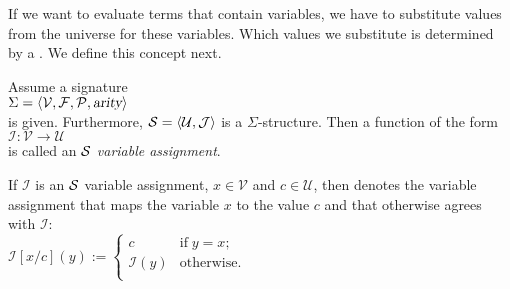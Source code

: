 If we want to evaluate terms that contain variables, we have to substitute values from the universe 
for these variables. Which values we substitute is determined by a .  We define this concept next. 

\begin{Definition}
    Assume a signature \\[0.2cm]
    \hspace*{1.3cm} $\Sigma = \langle \mathcal{V}, \mathcal{F}, \mathcal{P}, \textsl{arity} \rangle$ \\[0.2cm]
    is given.  Furthermore,  $\mathcal{S} = \langle \mathcal{U}, \mathcal{J} \rangle$ is a  $\Sigma$-structure.
    Then a function of the form \\[0.2cm]
    \hspace*{1.3cm} $\mathcal{I}: \mathcal{V} \rightarrow \mathcal{U}$ \\[0.2cm]
    is called an {\color{blue}$\mathcal{S}$ \emph{variable assignment}}.

    If  $\mathcal{I}$ is an $\mathcal{S}$ variable assignment, 
    $x \in \mathcal{V}$ and $c \in \mathcal{U}$, then  denotes the variable assignment
    that maps the variable  $x$ to the value $c$ and that otherwise agrees with $\mathcal{I}$: \\[0.2cm]
    \hspace*{1.3cm} 
    $\mathcal{I}[x/c](y) := \left\{
    \begin{array}{ll}
    c               & \mbox{if}\; y = x;  \\
    \mathcal{I}(y)  & \mbox{otherwise}.          \\
    \end{array}
    \right.$ \eox
\end{Definition}


